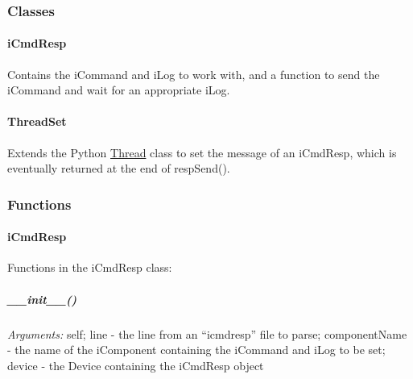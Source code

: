 \documentclass[12pt,letterpaper]{article}
\begin{document}
\setcounter{subsubsection}{-1}



%
%
\subsubsection{Classes}
\label{4.7.0}

\setcounter{paragraph}{-1}



%
%
\paragraph{iCmdResp}
\label{4.7.0.0}

Contains the iCommand and iLog to work with, and a function to send the iCommand and wait for an appropriate iLog.



%
%
\paragraph{ThreadSet}
\label{4.7.0.1}

Extends the Python \href{http://docs.python.org/library/threading.html#thread-objects}{Thread} class to set the message of an iCmdResp, which is eventually returned at the end of respSend().



%
%
\subsubsection{Functions}
\label{4.7.1}

\setcounter{paragraph}{-1}



%
%
\paragraph{iCmdResp}
\label{4.7.1.0}

Functions in the iCmdResp class:

\setcounter{subparagraph}{-1}



%
%
\subparagraph{\_\_init\_\_()}
\label{4.7.1.0.0}

\emph{Arguments:} self; line - the line from an ``icmdresp'' file to parse; componentName - the name of the iComponent containing the iCommand and iLog to be set; device - the Device containing the iCmdResp object
\end{document}
